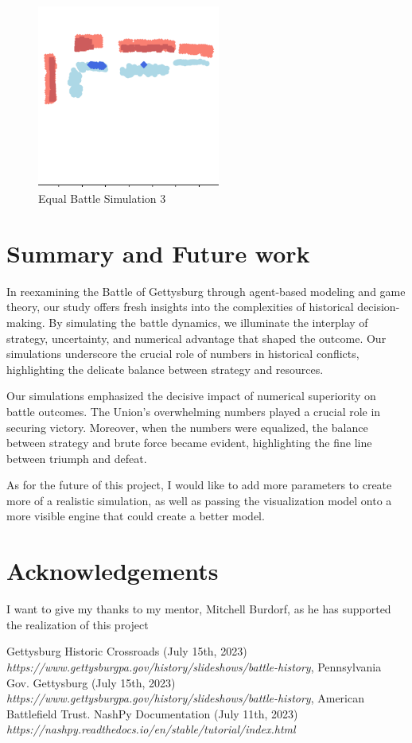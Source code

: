 \documentclass[final,5p,times,twocolumn,authoryear]{elsarticle}
\begin{document}
\begin{figure}[!ht]
  \centering
      \includegraphics[width=6cm]{Equal_battle_3.png}
      \caption{Equal Battle Simulation 3}
      \label{fig:Simulation}
  \centering
\end{figure}

\section{Summary and Future work}
In reexamining the Battle of Gettysburg through agent-based modeling and game theory, our study offers fresh insights into the complexities of historical decision-making. By simulating the battle dynamics, we illuminate the interplay of strategy, uncertainty, and numerical advantage that shaped the outcome. Our simulations underscore the crucial role of numbers in historical conflicts, highlighting the delicate balance between strategy and resources.

Our simulations emphasized the decisive impact of numerical superiority on battle outcomes. The Union's overwhelming numbers played a crucial role in securing victory. Moreover, when the numbers were equalized, the balance between strategy and brute force became evident, highlighting the fine line between triumph and defeat.

As for the future of this project, I would like to add more parameters to create more of a realistic simulation, as well as passing the visualization model onto a more visible engine that could create a better model.


\section*{Acknowledgements}
I want to give my thanks to my mentor, Mitchell Burdorf, as he has supported the realization of this project

 
\begin{thebibliography}{9}
\bibitem  Gettysburg Historic Crossroads (July 15th, 2023) \emph {https://www.gettysburgpa.gov/history/slideshows/battle-history}, Pennsylvania Gov.
\bibitem  Gettysburg (July 15th, 2023) \emph {https://www.gettysburgpa.gov/history/slideshows/battle-history}, American Battlefield Trust.
\bibitem  NashPy Documentation (July 11th, 2023) \emph{https://nashpy.readthedocs.io/en/stable/tutorial/index.html}
\end{thebibliography}
\end{document}
